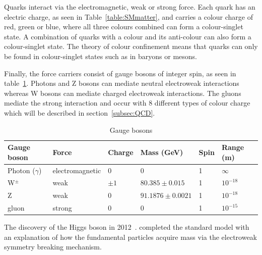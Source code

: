Quarks interact via the electromagnetic, weak or strong force. Each quark has an electric charge, as seen in Table~\ref{table:SMmatter}, and carries a colour charge of red, green or blue, where all three colours combined can form a colour-singlet state. A combination of quarks with a colour and its anti-colour can also form a colour-singlet state. The theory of colour confinement means that quarks can only be found in colour-singlet states such as in baryons or mesons. 

Finally, the force carriers consist of gauge bosons of integer spin, as seen in table~\ref{table:SMbosons}. Photons and Z bosons can mediate neutral electroweak interactions whereas W bosons can mediate charged electroweak interactions. The gluons mediate the strong interaction and occur with 8 different types of colour charge which will be described in section~\ref{subsec:QCD}. 
\begin{table}[ht!]
\centering
\caption{Gauge bosons}
\footnotesize
\label{table:SMbosons}
\begin{tabular}{|l|l|l|l|l|l|}
\hline
Gauge boson                       & Force           & Charge & Mass (GeV) & Spin & Range (m)  \\ \hline \hline
Photon ($\gamma$)                 & electromagnetic & 0      & 0          & 1    & $\infty$   \\ \hline
W$^{\pm}$                         & weak            & $\pm1$ & $80.385\pm0.015$           & 1    & $10^{-18}$ \\ \hline
Z                                 & weak            & 0      & $91.1876\pm0.0021$           & 1    & $10^{-18}$ \\ \hline
gluon                             & strong          & 0      & 0          & 1    & $10^{-15}$ \\ \hline
\end{tabular}
\end{table}

The discovery of the Higgs boson in 2012~\cite{Higgs2012observation,Aad:2012tfa,Aad:2015zhl}. completed the standard model with an explanation of how the fundamental particles acquire mass via the electroweak symmetry breaking mechanism.\\

